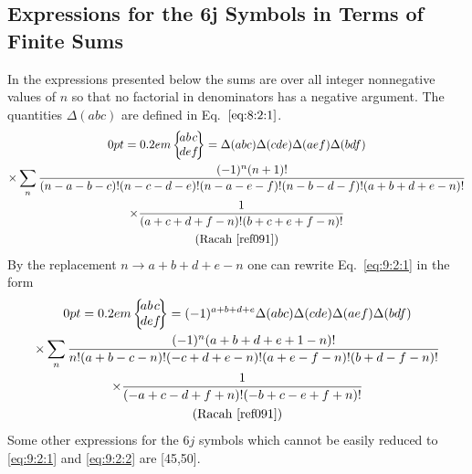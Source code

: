 \subsection{Expressions for the 6j Symbols in Terms of Finite Sums}\label{sec:9.2.1}
In the expressions presented below the sums are over all integer nonnegative values of $n$ so that no factorial in denominators has a negative argument. The quantities $\Delta(a b c)$ are defined in Eq.~$\eqref{eq:8:2:1}$. %
\begin{gather}
\sixj{a}{b}{c}{d}{e}{f}=\Delta(a b c) \Delta(c d e) \Delta(a e f) \Delta(b d f)  \notag\\
\times \sum_{n} \frac{(-1)^{n}(n+1)!}{(n-a-b-c)!(n-c-d-e)!(n-a-e-f)!(n-b-d-f)!(a+b+d+e-n)!}  \notag\\
\times \frac{1}{(a+c+d+f-n)!(b+c+e+f-n)!}  \notag\\
\text { (Racah \cite{ref091}) } \label{eq:9:2:1}
\end{gather}
By the replacement $n \rightarrow a+b+d+e-n$ one can rewrite Eq.~\eqref{eq:9:2:1} in the form
\begin{gather}
\sixj{a}{b}{c}{d}{e}{f}=(-1)^{a+b+d+e} \Delta(a b c) \Delta(c d e) \Delta(a e f) \Delta(b d f)  \notag\\
\times \sum_{n} \frac{(-1)^{n}(a+b+d+e+1-n)!}{n!(a+b-c-n)!(-c+d+e-n)!(a+e-f-n)!(b+d-f-n)!}  \notag\\
\times \frac{1}{(-a+c-d+f+n)!(-b+c-e+f+n)!}  \notag\\
\text { (Racah \cite{ref091}) } \label{eq:9:2:2}
\end{gather}
Some other expressions for the $6 j$ symbols which cannot be easily reduced to \eqref{eq:9:2:1} and \eqref{eq:9:2:2} are [45,50].
